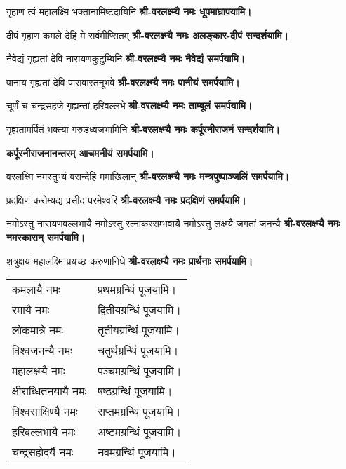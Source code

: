 \begin{center}
{गृहाण त्वं महालक्ष्मि भक्तानामिष्टदायिनि}
\textbf{श्री-वरलक्ष्म्यै नमः धूपमाघ्रापयामि।}
\medskip

{दीपं गृहाण कमले देहि मे सर्वमीप्सितम्}
\textbf{श्री-वरलक्ष्म्यै नमः अलङ्कार-दीपं सन्दर्शयामि। }
\medskip

{नैवेद्यं गृह्यतां देवि नारायणकुटुम्बिनि} 
\textbf{श्री-वरलक्ष्म्यै नमः नैवेद्यं समर्पयामि। }
\medskip

{पानाय गृह्यतां देवि पारावारतनूभवे} 
\textbf{श्री-वरलक्ष्म्यै नमः पानीयं समर्पयामि। }
\medskip


{चूर्णं च चन्द्रसहजे गृह्यन्तां हरिवल्लभे}
\textbf{श्री-वरलक्ष्म्यै नमः ताम्बूलं समर्पयामि। }
\medskip


{गृह्यतामर्पितं भक्त्या गरुडध्वजभामिनि}
\textbf{श्री-वरलक्ष्म्यै नमः कर्पूरनीराजनं  सन्दर्शयामि।}

\textbf{कर्पूरनीराजनानन्तरम् आचमनीयं समर्पयामि।}
\medskip

{वरलक्ष्मि नमस्तुभ्यं वरान्देहि ममाखिलान्}
\textbf{श्री-वरलक्ष्म्यै नमः मन्त्रपुष्पाञ्जलिं समर्पयामि।}
\medskip

{प्रदक्षिणं करोम्यद्य प्रसीद परमेश्वरि}
\textbf{श्री-वरलक्ष्म्यै नमः प्रदक्षिणं समर्पयामि।}
\medskip

{नमोऽस्तु नारायणवल्लभायै }
{नमोऽस्तु रत्नाकरसम्भवायै} 
{नमोऽस्तु लक्ष्म्यै जगतां जनन्यै} 
\textbf{श्री-वरलक्ष्म्यै नमः नमस्कारान् समर्पयामि।}
\medskip

{शत्रुक्षयं महालक्ष्मि प्रयच्छ करुणानिधे}
\textbf{श्री-वरलक्ष्म्यै नमः प्रार्थनाः समर्पयामि।}
\medskip


\begin{longtable}{l@{— }l}
कमलायै नमः & प्रथमग्रन्थिं पूजयामि।\\
रमायै नमः & द्वितीयग्रन्धिं पूजयामि।\\
लोकमात्रे नमः & तृतीयग्रन्थिं पूजयामि।\\
विश्वजनन्यै नमः & चतुर्थग्रन्थिं पूजयामि।\\
महालक्ष्म्यै नमः & पञ्चमग्रन्थिं पूजयामि।\\
क्षीराब्धितनयायै नमः & षष्ठग्रन्थिं पूजयामि।\\
विश्वसाक्षिण्यै नमः & सप्तमग्रन्थिं पूजयामि।\\
हरिवल्लभायै नमः & अष्टमग्रन्थिं पूजयामि।\\
चन्द्रसहोदर्यै नमः & नवमग्रन्थिं पूजयामि।\\
\end{longtable}


\end{center}
